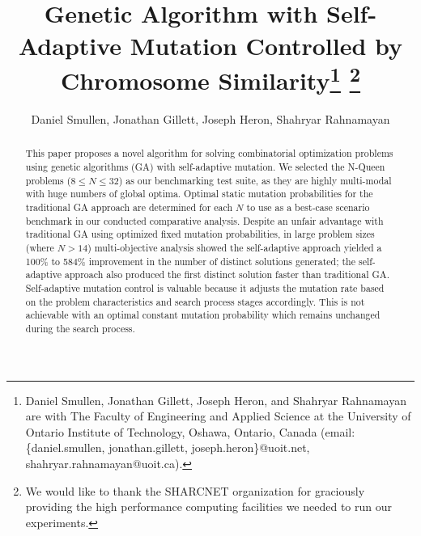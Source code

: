 \documentclass[conference]{IEEEtran}
\begin{document}
\title{\ \\ \LARGE\bf Genetic Algorithm with Self-Adaptive Mutation Controlled by Chromosome Similarity\thanks{Daniel Smullen, Jonathan Gillett, Joseph Heron, and Shahryar Rahnamayan are with The Faculty of Engineering and Applied Science at the University of Ontario Institute of Technology, Oshawa, Ontario, Canada (email: \{daniel.smullen, jonathan.gillett, joseph.heron\}@uoit.net, shahryar.rahnamayan@uoit.ca).} \thanks{We would like to thank the SHARCNET organization for graciously providing the high performance computing facilities we needed to run our experiments.}}

\author{Daniel Smullen, Jonathan Gillett, Joseph Heron, Shahryar Rahnamayan}


\maketitle

\begin{abstract}
This paper proposes a novel algorithm for solving combinatorial optimization problems using genetic algorithms (GA) with self-adaptive mutation. We selected the N-Queen problems ($8 \leq N \leq 32$) as our benchmarking test suite, as they are highly multi-modal with huge numbers of global optima. Optimal static mutation probabilities for the traditional GA approach are determined for each $N$ to use as a best-case scenario benchmark in our conducted comparative analysis. Despite an unfair advantage with traditional GA using optimized fixed mutation probabilities, in large problem sizes (where $N > 14$) multi-objective analysis showed the self-adaptive approach yielded a 100\% to 584\% improvement in the number of distinct solutions generated; the self-adaptive approach also produced the first distinct solution faster than traditional GA. Self-adaptive mutation control is valuable because it adjusts the mutation rate based on the problem characteristics and search process stages accordingly. This is not achievable with an optimal constant mutation probability which remains unchanged during the search process.
\end{abstract}
\end{document}
